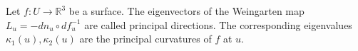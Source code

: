 Let $f: U \to \mathbb{R}^3$ be a surface. The eigenvectors of the Weingarten map $L_u = -dn_u \circ df_u^{-1}$ are called principal directions. The corresponding eigenvalues $\kappa_1(u), \kappa_2(u)$ are the principal curvatures of $f$ at $u$.